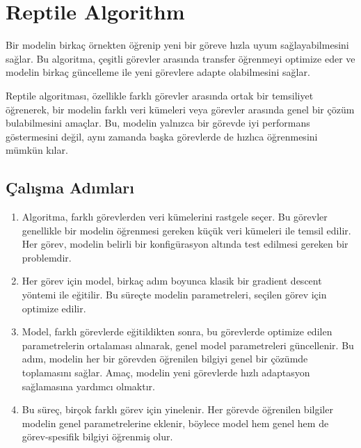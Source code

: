 \section{Reptile Algorithm}

Bir modelin birkaç örnekten öğrenip yeni bir göreve hızla uyum sağlayabilmesini sağlar. Bu algoritma, çeşitli görevler arasında transfer öğrenmeyi optimize eder ve modelin birkaç güncelleme ile yeni görevlere adapte olabilmesini sağlar.

Reptile algoritması, özellikle farklı görevler arasında ortak bir temsiliyet öğrenerek, bir modelin farklı veri kümeleri veya görevler arasında genel bir çözüm bulabilmesini amaçlar. Bu, modelin yalnızca bir görevde iyi performans göstermesini değil, aynı zamanda başka görevlerde de hızlıca öğrenmesini mümkün kılar.

\subsection{Çalışma Adımları}

\begin{enumerate}
    \item Algoritma, farklı görevlerden veri kümelerini rastgele seçer. Bu görevler genellikle bir modelin öğrenmesi gereken küçük veri kümeleri ile temsil edilir. Her görev, modelin belirli bir konfigürasyon altında test edilmesi gereken bir problemdir.
    \item Her görev için model, birkaç adım boyunca klasik bir gradient descent yöntemi ile eğitilir. Bu süreçte modelin parametreleri, seçilen görev için optimize edilir.
    \item Model, farklı görevlerde eğitildikten sonra, bu görevlerde optimize edilen parametrelerin ortalaması alınarak, genel model parametreleri güncellenir. Bu adım, modelin her bir görevden öğrenilen bilgiyi genel bir çözümde toplamasını sağlar. Amaç, modelin yeni görevlerde hızlı adaptasyon sağlamasına yardımcı olmaktır.
    \item Bu süreç, birçok farklı görev için yinelenir. Her görevde öğrenilen bilgiler modelin genel parametrelerine eklenir, böylece model hem genel hem de görev-spesifik bilgiyi öğrenmiş olur.
\end{enumerate}

\newpage